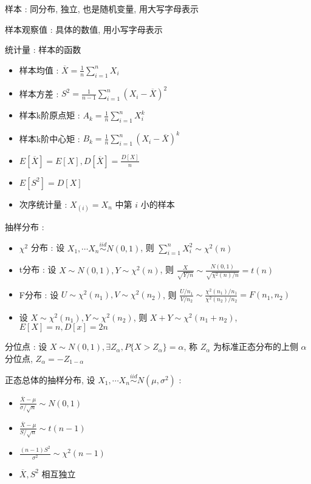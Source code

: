\documentclass[UTF8, 12pt]{ctexart}
\begin{document}
	样本 : 同分布, 独立, 也是随机变量, 用大写字母表示

	样本观察值 : 具体的数值, 用小写字母表示

	统计量 : 样本的函数
	\begin{itemize}[leftmargin = 4em]
		\item 样本均值 : $ \overline{X} = \frac{1}{n}\sum\limits_{i=1}^{n}X_{i} $
		\item 样本方差 : $ S^{2} = \frac{1}{n-1}\sum\limits_{i=1}^{n}(X_{i} - \overline{X})^{2} $
		\item 样本k阶原点矩 : $ A_{k} = \frac{1}{n}\sum_{i=1}^{n}X_{i}^{k} $
		\item 样本k阶中心矩 : $ B_{k} = \frac{1}{n}\sum_{i=1}^{n}(X_{i} - \overline{X})^{k} $
		\item $ E[\overline{X}] = E[X], D[\overline{X}] = \frac{D[X]}{n} $
		\item $ E[S^{2}] = D[X] $
		\item 次序统计量 : $ X_{(i)} = X_{n} $ 中第 $ i $ 小的样本 
	\end{itemize}

	抽样分布 : 
	\begin{itemize}[leftmargin = 4em]
		\item $ \chi^{2} $ 分布 : 设 $ X_{1}, \cdots X_{n} \overset{iid}{\sim} N(0, 1) $, 则 $ \sum_{i=1}^{n}X_{i}^{2} \sim \chi^{2}(n) $
		\item t分布 : 设 $ X \sim N(0, 1), Y \sim \chi^{2}(n) $, 则 $ \frac{X}{\sqrt{Y/n}} \sim \frac{N(0, 1)}{\sqrt{\chi^{2}(n)/n}} = t(n) $
		\item F分布 : 设 $ U \sim \chi^{2}(n_{1}), V \sim \chi^{2}(n_{2}) $, 则 $ \frac{U/n_{1}}{V/n_{2}} \sim \frac{\chi^{2}(n_{1})/n_{1}}{\chi^{2}(n_{2})/n_{2}} = F(n_{1}, n_{2}) $ 
		\item 设 $ X \sim \chi^{2}(n_{1}), Y \sim \chi^{2}(n_{2}) $, 则 $ X+Y \sim \chi^{2}(n_{1}+n_{2}) $, $ E[X] = n, D[x] = 2n $
	\end{itemize}

	分位点 : 设 $ X \sim N(0, 1) , \exists Z_{\alpha}, P\{X > Z_{\alpha}\} = \alpha $, 称 $ Z_{\alpha} $ 为标准正态分布的上侧 $ \alpha $ 分位点, $ Z_{\alpha} = -Z_{1-\alpha} $ 

	正态总体的抽样分布, 设 $ X_{1}, \cdots X_{n} \overset{iid}{\sim} N(\mu, \sigma^{2}) $ :
	\begin{itemize}[leftmargin = 4em]
		\item $ \frac{\overline{X} - \mu}{\sigma/\sqrt{n}} \sim N(0, 1) $
		\item $ \frac{\overline{X} - \mu}{S/\sqrt{n}} \sim t(n-1) $
		\item $ \frac{(n-1)S^{2}}{\sigma^{2}} \sim \chi^{2}(n-1) $
		\item $ \overline{X}, S^{2} $ 相互独立
	\end{itemize}
\end{document}

